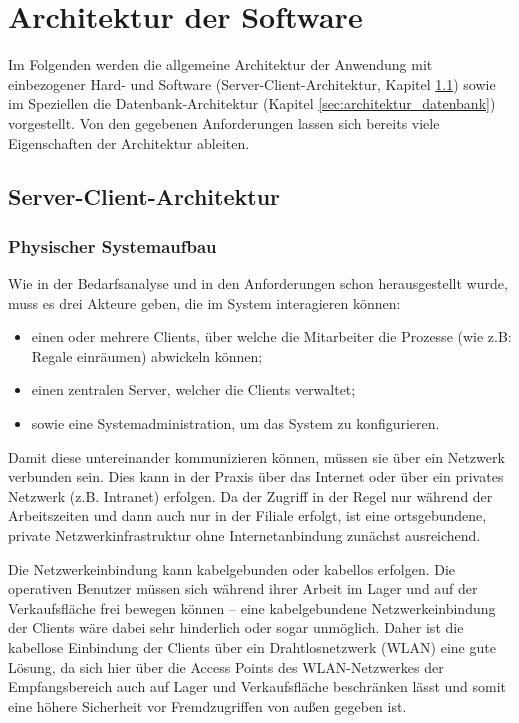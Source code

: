\chapter{Architektur der Software}
\label{cha:architektur}
\sloppy

Im Folgenden werden die allgemeine Architektur der Anwendung mit einbezogener Hard- und Software (Server-Client-Architektur, Kapitel \ref{sec:architektur_serverclient}) sowie im Speziellen die Datenbank-Architektur (Kapitel \ref{sec:architektur_datenbank}) vorgestellt. Von den gegebenen Anforderungen lassen sich bereits viele Eigenschaften der Architektur ableiten.

\section{Server-Client-Architektur}
\label{sec:architektur_serverclient}

\subsection{Physischer Systemaufbau}

Wie in der Bedarfsanalyse und in den Anforderungen schon herausgestellt wurde, muss es drei Akteure geben, die im System interagieren können:

\begin{itemize}
	\item einen oder mehrere Clients, über welche die Mitarbeiter die Prozesse (wie z.B: Regale einräumen) abwickeln können;
	\item einen zentralen Server, welcher die Clients verwaltet;
	\item sowie eine Systemadministration, um das System zu konfigurieren.
\end{itemize}

Damit diese untereinander kommunizieren können, müssen sie über ein Netzwerk verbunden sein. Dies kann in der Praxis über das Internet oder über ein privates Netzwerk (z.B. Intranet) erfolgen. Da der Zugriff in der Regel nur während der Arbeitszeiten und dann auch nur in der Filiale erfolgt, ist eine ortsgebundene, private Netzwerkinfrastruktur ohne Internetanbindung zunächst ausreichend.

Die Netzwerkeinbindung kann kabelgebunden oder kabellos erfolgen. Die operativen Benutzer müssen sich während ihrer Arbeit im Lager und auf der Verkaufsfläche frei bewegen können -- eine kabelgebundene Netzwerkeinbindung der Clients wäre dabei sehr hinderlich oder sogar unmöglich. Daher ist die kabellose Einbindung der Clients über ein Drahtlosnetzwerk (\ac{WLAN}) eine gute Lösung, da sich hier über die Access Points des \ac{WLAN}-Netzwerkes der Empfangsbereich auch auf Lager und Verkaufsfläche beschränken lässt und somit eine höhere Sicherheit vor Fremdzugriffen von außen gegeben ist.

